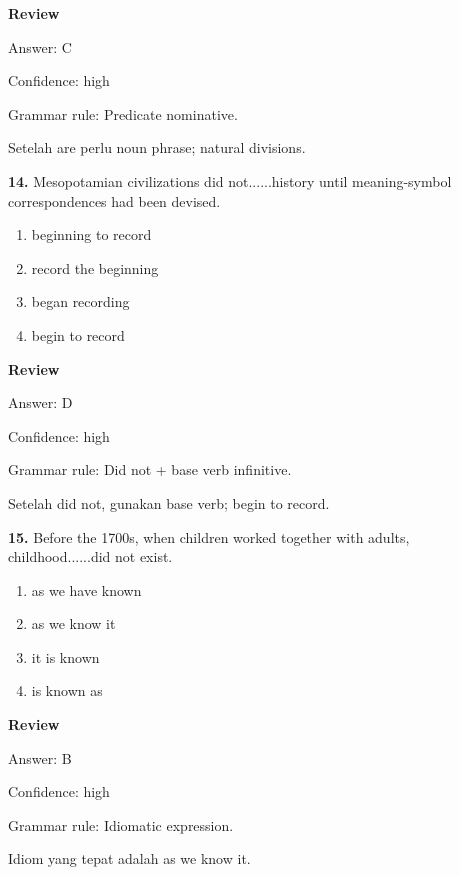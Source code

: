 \documentclass[12pt]{article}
\begin{document}
\par
\begingroup
\setlength{\parskip}{0pt}
\setlength{\parindent}{0pt}
\textbf{Review}\par
Answer: C\par
Confidence: high\par
Grammar rule: Predicate nominative.\par
Setelah are perlu noun phrase; natural divisions.\par
\endgroup
\par
\vspace{0.25\baselineskip}
\noindent\textbf{14.} Mesopotamian civilizations did not......history until meaning-symbol correspondences had been devised.
\begin{enumerate}[label=(\Alph*),leftmargin=*,itemsep=0.2em]
\item beginning to record
\item record the beginning
\item began recording
\item begin to record
\end{enumerate}
\par
\begingroup
\setlength{\parskip}{0pt}
\setlength{\parindent}{0pt}
\textbf{Review}\par
Answer: D\par
Confidence: high\par
Grammar rule: Did not + base verb infinitive.\par
Setelah did not, gunakan base verb; begin to record.\par
\endgroup
\par
\vspace{0.25\baselineskip}
\noindent\textbf{15.} Before the 1700s, when children worked together with adults, childhood......did not exist.
\begin{enumerate}[label=(\Alph*),leftmargin=*,itemsep=0.2em]
\item as we have known
\item as we know it
\item it is known
\item is known as
\end{enumerate}
\par
\begingroup
\setlength{\parskip}{0pt}
\setlength{\parindent}{0pt}
\textbf{Review}\par
Answer: B\par
Confidence: high\par
Grammar rule: Idiomatic expression.\par
Idiom yang tepat adalah as we know it.\par
\endgroup
\par
\vspace{0.25\baselineskip}
\end{document}
